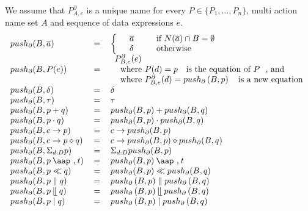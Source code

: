 \documentclass{article}
\providecommand{\at}{\mathbin{\mbox{\aap ,}}}
\providecommand{\leftmerge}{\mathbin{\mathrel{\llfloor}}}
\begin{document}
We assume that $P_{A,e}^{\partial }$ is a unique name for every $P\in
\{P_{1},\ldots ,P_{n}\}$, multi action name set $A$ and sequence of data
expressions $e$.%
\[
\begin{tabular}{lll}
$push_{\partial }(B,\overline{a})$ & $=$ & $\left\{ \text{ }%
\begin{array}{lll}
\overline{a} &  & \text{if }N(\overline{a})\cap B=\emptyset \\ 
\delta &  & \text{otherwise}%
\end{array}%
\right. $ \\ 
$push_{\partial }(B,P(e))$ & $=$ & $%
\begin{array}{l}
P_{B,e}^{\partial }(e) \\ 
\text{where }P(d)=p\text{ is the equation of }P\text{, and} \\ 
\text{where }P_{B,e}^{\partial }(d)=push_{\partial }\left( B,p\right) \text{
is a new equation}%
\end{array}%
$ \\ 
$push_{\partial }(B,\delta )$ & $=$ & $\delta $ \\ 
$push_{\partial }(B,\tau )$ & $=$ & $\tau $ \\ 
$push_{\partial }(B,p+q)$ & $=$ & $push_{\partial }(B,p)+push_{\partial
}(B,q)$ \\ 
$push_{\partial }(B,p\cdot q)$ & $=$ & $push_{\partial }(B,p)\cdot
push_{\partial }(B,q)$ \\ 
$push_{\partial }(B,c\rightarrow p)$ & $=$ & $c\rightarrow push_{\partial
}(B,p)$ \\ 
$push_{\partial }(B,c\rightarrow p\diamond q)$ & $=$ & $c\rightarrow
push_{\partial }(B,p)\diamond push_{\partial }(B,q)$ \\ 
$push_{\partial }(B,\Sigma _{d:D}p)$ & $=$ & $\Sigma _{d:D}push_{\partial
}(B,p)$ \\ 
$push_{\partial }(B,p\at t)$ & $=$ & $push_{\partial }(B,p)\at t$ \\ 
$push_{\partial }(B,p\ll q)$ & $=$ & $push_{\partial }(B,p)\ll
push_{\partial }(B,q)$ \\ 
$push_{\partial }(B,p\parallel q)$ & $=$ & $push_{\partial }\left(
B,p\right) \parallel push_{\partial }\left( B,q\right) $ \\ 
$push_{\partial }(B,p\leftmerge q)$ & $=$ & $push_{\partial }\left(
B,p\right) \leftmerge push_{\partial }\left( B,q\right) $ \\ 
$push_{\partial }(B,p\mid q)$ & $=$ & $push_{\partial }\left( B,p\right)
\mid push_{\partial }\left( B,q\right) $ \\ 

\end{tabular}\]
\end{document}
